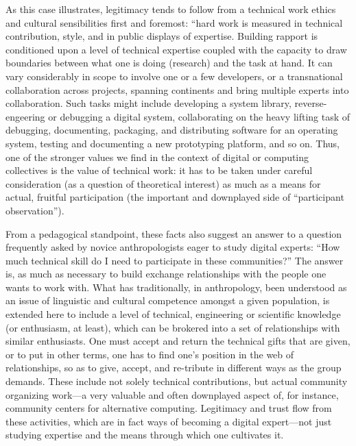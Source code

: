 \documentclass[10pt,letter,oneside]{scrartcl}
\begin{document}

As this case illustrates, legitimacy tends to follow from a technical
work ethics and cultural sensibilities first and foremost: ``hard work 
is measured in technical contribution, style, and in public displays of
expertise. Building rapport is conditioned upon a level of technical
expertise coupled with the capacity to draw boundaries between what
one is doing (research) and the task at hand. It can vary considerably
in scope to involve one or a few developers, or a transnational
collaboration across projects, spanning continents and bring multiple
experts into collaboration.  Such tasks might include developing a
system library, reverse-engeering or debugging a digital system, collaborating 
on the heavy lifting task of debugging, documenting, packaging, and
distributing software for an operating system, testing and documenting
a new prototyping platform, and so on. Thus, one of the stronger
values we find in the context of digital or computing collectives is the value of
technical work: it has to be taken under careful consideration (as a question of
theoretical interest) as much as a means for actual, fruitful
participation (the important and downplayed side of ``participant
observation'').

From a pedagogical standpoint, these facts also suggest an answer to a
question frequently asked by novice anthropologists eager to study
digital experts: ``How much technical skill do I need to participate
in these communities?''  The answer is, as much as necessary to
build exchange relationships with the people one wants to work with.  What
has traditionally, in anthropology, been understood as an issue of
linguistic and cultural competence amongst a given population, is
extended here to include a level of technical, engineering or
scientific knowledge (or enthusiasm, at least), which can be brokered
into a set of relationships with similar enthusiasts. One must accept
and return the technical gifts that are given, or to put in other
terms, one has to find one's position in the web of relationships, so
as to give, accept, and re-tribute in different ways as the group
demands. These include not solely technical contributions, but actual
community organizing work---a very valuable and often downplayed
aspect of, for instance, community centers for alternative computing.
Legitimacy and trust flow from these activities, which are in fact
ways of becoming a digital expert---not just studying expertise and
the means through which one cultivates it.
\end{document}
